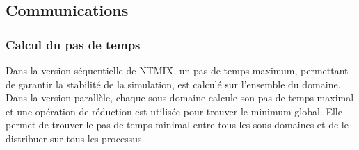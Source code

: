 


\subsection{Communications}

\subsubsection{Calcul du pas de temps}
Dans la version séquentielle de NTMIX, un pas de temps maximum, permettant de garantir la stabilité de la simulation, est calculé sur l'ensemble du domaine.
Dans la version parallèle, chaque sous-domaine calcule son pas de temps maximal et une opération de réduction est utilisée pour trouver le minimum global. Elle permet de trouver le pas de temps minimal entre tous les sous-domaines et de le distribuer sur tous les processus.


